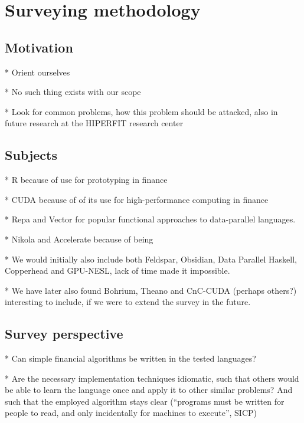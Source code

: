 \chapter{Surveying methodology}

\section{Motivation}

* Orient ourselves

* No such thing exists with our scope

* Look for common problems, how this problem should be attacked, also
  in future research at the HIPERFIT research center

\section{Subjects}
* R because of use for prototyping in finance

* CUDA because of of its use for high-performance computing in finance

* Repa and Vector for popular functional approaches to data-parallel languages.

* Nikola and Accelerate because of being

* We would initially also include both Feldspar, Obsidian, Data
  Parallel Haskell, Copperhead and GPU-NESL, lack of time made it impossible.

* We have later also found Bohrium, Theano and CnC-CUDA (perhaps others?)
  interesting to include, if we were to extend the survey in the future.

\section{Survey perspective}

* Can simple financial algorithms be written in the tested languages?

* Are the necessary implementation techniques idiomatic, such that
  others would be able to learn the language once and apply it to other
  similar problems? And such that the employed algorithm stays clear
  (``programs must be written for people to read, and only incidentally
     for machines to execute'', SICP)

